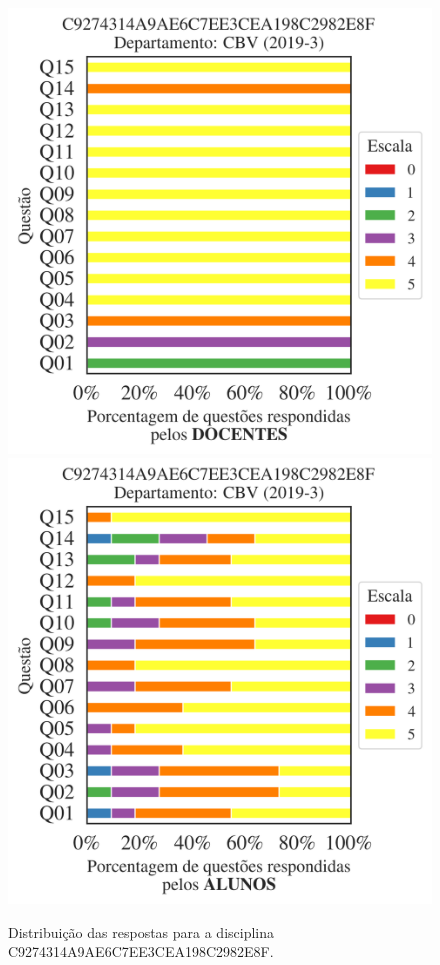 \documentclass[a4paper,10pt]{article}
\begin{document}
\begin{figure}[h]
\centering
\includegraphics[width=0.485\linewidth]{analise_disciplina_departamento_CBV_C9274314A9AE6C7EE3CEA198C2982E8F_docentes.png}
\includegraphics[width=0.485\linewidth]{analise_disciplina_departamento_CBV_C9274314A9AE6C7EE3CEA198C2982E8F_alunos.png}
\caption{\label{fig:analise_geral_departamento}                Distribuição das respostas para a disciplina C9274314A9AE6C7EE3CEA198C2982E8F. }
\end{figure}
\end{document}
